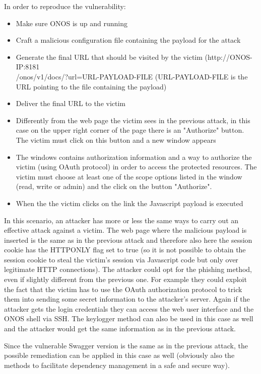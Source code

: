 \documentclass[a4paper,10pt]{memoir}
\begin{document}
In order to reproduce the vulnerability:
\begin{itemize}
    \item Make sure ONOS is up and running
    \item Craft a malicious configuration file containing the payload for the attack
    \item Generate the final URL that should be visited by the victim (http://ONOS-IP:8181\\/onos/v1/docs/?url=URL-PAYLOAD-FILE (URL-PAYLOAD-FILE is the URL pointing to the file containing the payload)
    \item Deliver the final URL to the victim
    \item Differently from the web page the victim sees in the previous attack, in this case on the upper right corner of the page there is an "Authorize" button. The victim must click on this button and a new window appears
    \item The windows contains authorization information and a way to authorize the victim (using OAuth protocol) in order to access the protected resources. The victim must choose at least one of the scope options listed in the window (read, write or admin) and the click on the button "Authorize".
    \item When the the victim clicks on the link the Javascript payload is executed
\end{itemize}
In this scenario, an attacker has more or less the same ways to carry out an effective attack against a victim. The web page where the malicious payload is inserted is the same as in the previous attack and therefore also here the session cookie has the HTTPONLY flag set to true (so it is not possible to obtain the session cookie to steal the victim's session via Javascript code but only over legitimate HTTP connections). The attacker could opt for the phishing method, even if slightly different from the previous one. For example they could exploit the fact that the victim has to use the OAuth authorization protocol to trick them into sending some secret information to the attacker's server. Again if the attacker gets the login credentials they can access the web user interface and the ONOS shell via SSH. The keylogger method can also be used in this case as well and the attacker would get the same information as in the previous attack.

Since the vulnerable Swagger version is the same as in the previous attack, the possible remediation can be applied in this case as well (obviously also the methods to facilitate dependency management in a safe and secure way).
\end{document}
